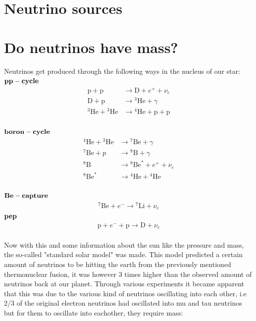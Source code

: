 \documentclass[11pt,a4paper,faculty=we,language=en,doctype=report]{cls/ugent-doc}
\begin{document}
\section{Neutrino sources}

\section{Do neutrinos have mass?}
Neutrinos get produced through the following ways in the nucleus of our star:\\
$\bold{pp-cycle}$
\begin{align}
	\mathrm{p} + \mathrm{p} &\rightarrow \mathrm{D} + e^+ + \nu_e\\
	\mathrm{D} + \mathrm{p} &\rightarrow {}^3\mathrm{He} + \gamma\\
	{}^3\mathrm{He} + {}^3\mathrm{He} &\rightarrow {}^4\mathrm{He} + \mathrm{p} + \mathrm{p}
\end{align}\\
$\bold{boron-cycle}$
\begin{align}
{ }^4 \mathrm{He}+{ }^3 \mathrm{He} & \rightarrow{ }^7 \mathrm{Be}+\gamma \\
{ }^7 \mathrm{Be}+p & \rightarrow { }^8\mathrm{B} + \gamma \\
{ }^8 \mathrm{B} & \rightarrow{ }^8 \mathrm{Be}^*+e^{+}+\nu_e \\
{ }^8 \mathrm{Be}^* & \rightarrow{ }^4 \mathrm{He}+{ }^4 \mathrm{He}
\end{align}\\
$\bold{Be-capture}$
\begin{align}
	^7\mathrm{Be} + e^- \rightarrow {}^7\mathrm{Li} + \nu_e
\end{align}
$\bold{pep}$
\begin{align}
	\mathrm{p} + e^- + \mathrm{p} \rightarrow \mathrm{D} + \nu_e
\end{align}\\
Now with this and some information about the sun like the pressure and mass, 
the so-called "standard solar model" was
made. This model predicted a certain amount of neutrinos to be hitting the earth from the previously
mentioned thermonuclear fusion, it was however 3 times higher than the observed amount of neutrinos back
at our planet. Through various experiments it became apparent that this was due to the various kind of
neutrinos oscillating into each other, i.e 2/3 of the original electron 
neutrinos had oscillated into mu and tau neutrinos
but for them to oscillate into eachother, they require mass:
\end{document}
